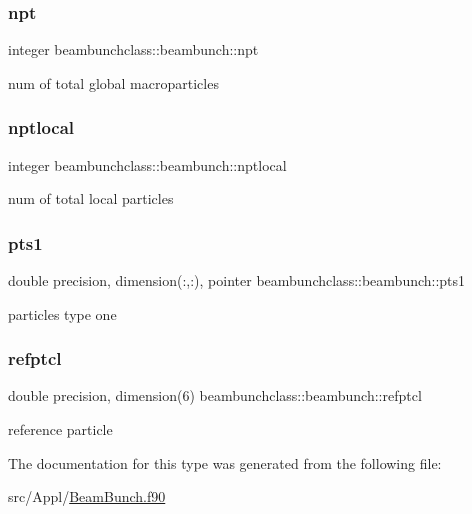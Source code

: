\subsubsection{\texorpdfstring{npt}{npt}}
{\footnotesize\ttfamily integer beambunchclass\+::beambunch\+::npt}



num of total global macroparticles 

\mbox{\label{structbeambunchclass_1_1beambunch_a71a8687235fdc19d862fb13092b714a3}} 
\subsubsection{\texorpdfstring{nptlocal}{nptlocal}}
{\footnotesize\ttfamily integer beambunchclass\+::beambunch\+::nptlocal}



num of total local particles 

\mbox{\label{structbeambunchclass_1_1beambunch_af0d19c1e3e537ade010af8554783c8d7}} 
\subsubsection{\texorpdfstring{pts1}{pts1}}
{\footnotesize\ttfamily double precision, dimension(\+:,\+:), pointer beambunchclass\+::beambunch\+::pts1}



particles type one 

\mbox{\label{structbeambunchclass_1_1beambunch_a973e0e4ee1b24185bac1d727d2c074f5}} 
\subsubsection{\texorpdfstring{refptcl}{refptcl}}
{\footnotesize\ttfamily double precision, dimension(6) beambunchclass\+::beambunch\+::refptcl}



reference particle 



The documentation for this type was generated from the following file\+:\begin{DoxyCompactItemize}
\item 
src/\+Appl/\mbox{\hyperlink{_beam_bunch_8f90}{Beam\+Bunch.\+f90}}\end{DoxyCompactItemize}
